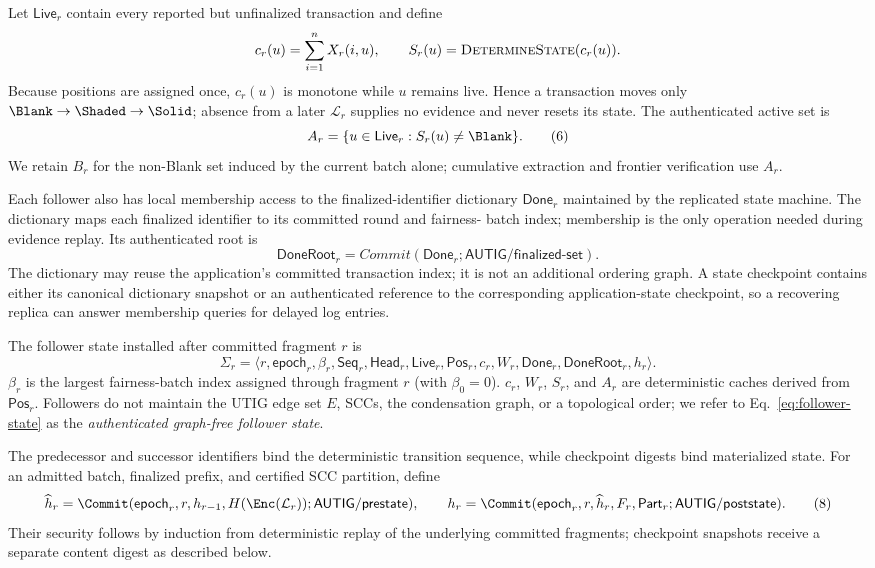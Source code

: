 Let $\mathsf{Live}_r$ contain every reported but unfinalized transaction and
define
\[
 c_r(u)=\sum_{i=1}^{n}X_r(i,u),\qquad
 S_r(u)=\textsc{DetermineState}(c_r(u)).
\]
Because positions are assigned once, $c_r(u)$ is monotone while $u$ remains
live.  Hence a transaction moves only
$\Blank\rightarrow\Shaded\rightarrow\Solid$; absence from a later
$\mathcal L_r$ supplies no evidence and never resets its state.  The
authenticated active set is
\[
 A_r=\{u\in\mathsf{Live}_r:S_r(u)\ne\Blank\}.
 \tag{6}\label{eq:active-set}
\]
We retain $B_r$ for the non-Blank set induced by the current batch alone;
cumulative extraction and frontier verification use $A_r$.

Each follower also has local membership access to the finalized-identifier
dictionary $\mathsf{Done}_r$ maintained by the replicated state machine.  The
dictionary maps each finalized identifier to its committed round and fairness-
batch index; membership is the only operation needed during evidence replay.
Its authenticated root is
\[
 \mathsf{DoneRoot}_r=Commit(\mathsf{Done}_r;
                       \mathsf{AUTIG/finalized\mbox{-}set}).
\]
The dictionary may reuse the application's committed transaction index; it is
not an additional ordering graph.  A state checkpoint contains either its
canonical dictionary snapshot or an authenticated reference to the
corresponding application-state checkpoint, so a recovering replica can
answer membership queries for delayed log entries.

The follower state installed after committed fragment $r$ is
\[
 \Sigma_r=\langle r,\mathsf{epoch}_r,\beta_r,\mathsf{Seq}_r,
 \mathsf{Head}_r,\mathsf{Live}_r,\mathsf{Pos}_r,c_r,W_r,
 \mathsf{Done}_r,\mathsf{DoneRoot}_r,h_r\rangle.
 \tag{7}\label{eq:follower-state}
\]
$\beta_r$ is the largest fairness-batch index assigned through fragment $r$
(with $\beta_0=0$).  $c_r$, $W_r$, $S_r$, and $A_r$ are deterministic caches derived from
$\mathsf{Pos}_r$.  Followers do not maintain the UTIG edge set $E$, SCCs, the
condensation graph, or a topological order; we refer to
Eq.~\eqref{eq:follower-state} as the \emph{authenticated graph-free follower
state}.

The predecessor and successor identifiers bind the deterministic transition
sequence, while checkpoint digests bind materialized state.  For an admitted
batch, finalized prefix, and certified SCC partition, define
\[
 \widehat h_r=\Commit(\mathsf{epoch}_r,r,h_{r-1},
                    H(\Enc(\mathcal L_r));
                    \mathsf{AUTIG/prestate}),
 \qquad
 h_r=\Commit(\mathsf{epoch}_r,r,\widehat h_r,F_r,\mathsf{Part}_r;
             \mathsf{AUTIG/poststate}).
 \tag{8}\label{eq:state-identifiers}
\]
Their security follows by induction from deterministic replay of the
underlying committed fragments; checkpoint snapshots receive a separate
content digest as described below.

